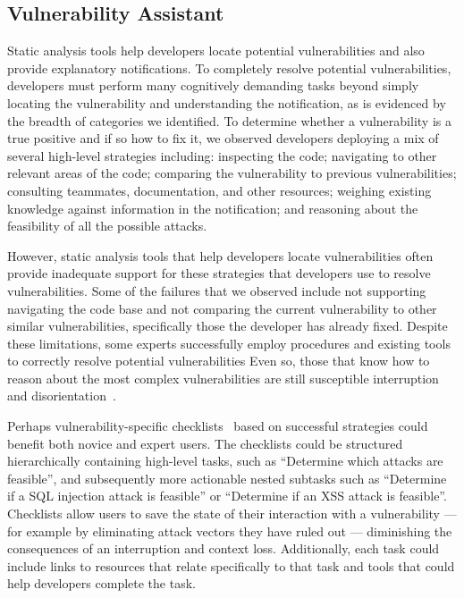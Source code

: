 \documentclass{acm_proc_article-sp}
\begin{document}
\subsection{Vulnerability Assistant}
Static analysis tools help developers locate potential vulnerabilities and also provide explanatory notifications.
To completely resolve potential vulnerabilities, developers must perform many cognitively demanding tasks beyond simply locating the vulnerability and understanding the notification, as is evidenced by the breadth of categories we identified. 
To determine whether a vulnerability is a true positive and if so how to fix it, we observed developers deploying a mix of several high-level strategies including: inspecting the code;
navigating to other relevant areas of the code; 
comparing the vulnerability to previous vulnerabilities; 
consulting teammates, documentation, and other resources; 
weighing existing knowledge against information in the notification; 
and reasoning about the feasibility of all the possible attacks. 

However, static analysis tools that help developers locate vulnerabilities often provide inadequate support for these strategies that developers use to resolve vulnerabilities. 
Some of the failures that we observed include not supporting navigating the code base and not comparing the current vulnerability to other similar vulnerabilities, specifically those the developer has already fixed. 
Despite these limitations, some experts successfully employ procedures and existing tools to correctly resolve potential vulnerabilities
Even so, those that know how to reason about the most complex vulnerabilities are still susceptible interruption~\cite{parnin2012programmer} and disorientation~\cite{deAlwis2006disorient}.

Perhaps vulnerability-specific checklists~\cite{phang2009triaging} based on successful strategies could benefit both novice and expert users.
The checklists could be structured hierarchically containing high-level tasks, such as 	``Determine which attacks are feasible'', and subsequently more actionable nested subtasks such as ``Determine if a SQL injection attack is feasible'' or ``Determine if an XSS attack is feasible''.
Checklists allow users to save the state of their interaction with a vulnerability --- for example by eliminating attack vectors they have ruled out --- diminishing the consequences of an interruption and context loss.
Additionally, each task could include links to resources that relate specifically to that task and tools that could help developers complete the task.
\end{document}
